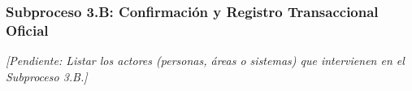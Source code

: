 \subsubsection{Subproceso 3.B: Confirmación y Registro Transaccional Oficial}

\textit{[Pendiente: Listar los actores (personas, áreas o sistemas) que intervienen en el Subproceso 3.B.]}

